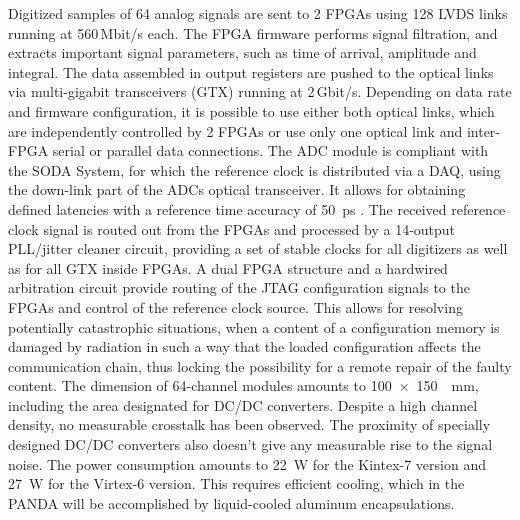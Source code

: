 \documentclass[12pt,a4paper, twocolumn]{article}
\begin{document}
Digitized samples of 64 analog signals are sent to 2 FPGAs using 128 LVDS links running at 560\,Mbit/s each. 
The FPGA firmware performs signal filtration, and extracts important signal parameters, such as time of arrival, amplitude and integral. 
The data assembled in output registers are pushed to the optical links via multi-gigabit transceivers (GTX) running at 2\,Gbit/s. Depending on data rate and firmware configuration, it is possible to use either both optical links, which are independently controlled by 2 FPGAs or use only one optical link and inter-FPGA serial or parallel data connections.
The ADC module is compliant with the SODA System, for which the reference clock is distributed via a DAQ, using the down-link part of the ADCs optical transceiver. It allows for obtaining defined latencies with a reference time accuracy of \SI{50}{\pico\second} \cite{konorov}. The received reference clock signal is routed out from the FPGAs and processed by a 14-output PLL/jitter cleaner circuit, providing a set of stable clocks for all digitizers as well as for all GTX inside FPGAs. 
A dual FPGA structure and a hardwired arbitration circuit provide routing of the JTAG configuration signals to the FPGAs and control of the reference clock source. This allows for resolving potentially catastrophic situations, when a content of a configuration memory is damaged by radiation in such a way that the loaded configuration affects the communication chain, thus locking the possibility for a remote repair of the faulty content.
The dimension of 64-channel modules amounts to \SI{100 x 150}{\squared\milli\metre}, including the area designated for DC/DC converters. Despite a high channel density, no measurable crosstalk has been observed. The proximity of specially designed DC/DC converters also doesn’t give any measurable rise to the signal noise. The power consumption amounts to \SI{22}{\watt} for the  Kintex-7 version and \SI{27}{\watt} for the Virtex-6 version. This requires efficient cooling, which in the PANDA will be accomplished by liquid-cooled aluminum encapsulations.
\end{document}
